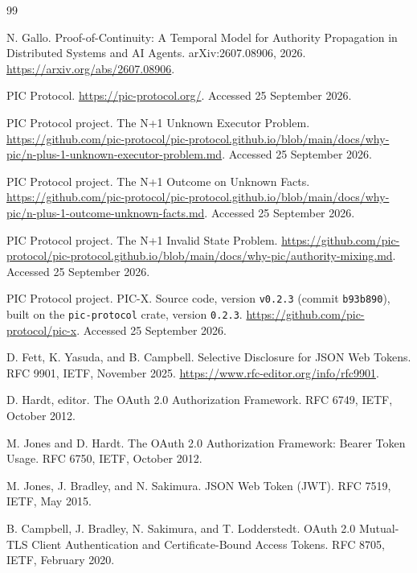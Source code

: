 \documentclass[10pt,twocolumn]{article}
\begin{document}
\begin{thebibliography}{99}

N. Gallo.
\newblock Proof-of-Continuity: A Temporal Model for Authority Propagation in
Distributed Systems and AI Agents.
\newblock arXiv:2607.08906, 2026. \url{https://arxiv.org/abs/2607.08906}.

PIC Protocol.
\newblock \url{https://pic-protocol.org/}.
\newblock Accessed 25 September 2026.

PIC Protocol project.
\newblock The N+1 Unknown Executor Problem.
\newblock
\url{https://github.com/pic-protocol/pic-protocol.github.io/blob/main/docs/why-pic/n-plus-1-unknown-executor-problem.md}.
\newblock Accessed 25 September 2026.

PIC Protocol project.
\newblock The N+1 Outcome on Unknown Facts.
\newblock
\url{https://github.com/pic-protocol/pic-protocol.github.io/blob/main/docs/why-pic/n-plus-1-outcome-unknown-facts.md}.
\newblock Accessed 25 September 2026.

PIC Protocol project.
\newblock The N+1 Invalid State Problem.
\newblock
\url{https://github.com/pic-protocol/pic-protocol.github.io/blob/main/docs/why-pic/authority-mixing.md}.
\newblock Accessed 25 September 2026.

PIC Protocol project.
\newblock PIC-X.
\newblock Source code, version \texttt{v0.2.3} (commit \texttt{b93b890}), built
on the \texttt{pic-protocol} crate, version \texttt{0.2.3}.
\newblock \url{https://github.com/pic-protocol/pic-x}.
\newblock Accessed 25 September 2026.

D. Fett, K. Yasuda, and B. Campbell.
\newblock Selective Disclosure for JSON Web Tokens.
\newblock RFC 9901, IETF, November 2025.
\newblock \url{https://www.rfc-editor.org/info/rfc9901}.

D. Hardt, editor.
\newblock The OAuth 2.0 Authorization Framework.
\newblock RFC 6749, IETF, October 2012.

M. Jones and D. Hardt.
\newblock The OAuth 2.0 Authorization Framework: Bearer Token Usage.
\newblock RFC 6750, IETF, October 2012.

M. Jones, J. Bradley, and N. Sakimura.
\newblock JSON Web Token (JWT).
\newblock RFC 7519, IETF, May 2015.

B. Campbell, J. Bradley, N. Sakimura, and T. Lodderstedt.
\newblock OAuth 2.0 Mutual-TLS Client Authentication and Certificate-Bound
Access Tokens.
\newblock RFC 8705, IETF, February 2020.


\end{thebibliography}
\end{document}
